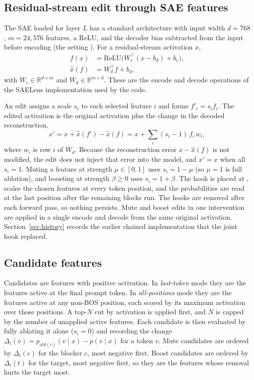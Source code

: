 \documentclass[conference]{IEEEtran}
\newcommand{\code}[1]{\texttt{\detokenize{#1}}}
\begin{document}
\subsection{Residual-stream edit through SAE features}
The SAE loaded for layer $L$ has a standard architecture with input width $d=768$, $m=24{,}576$ features, a ReLU, and the decoder bias subtracted from the input before encoding (the setting \code{apply_b_dec_to_input=True}). For a residual-stream activation $x$,
\begin{align}
f(x) &= \mathrm{ReLU}\!\big(W_e^{\top}(x-b_d)+b_e\big),\\
\hat{x}(f) &= W_d^{\top} f + b_d,
\end{align}
with $W_e\in\mathbb{R}^{d\times m}$ and $W_d\in\mathbb{R}^{m\times d}$. These are the encode and decode operations of the SAELens implementation used by the code.

An edit assigns a scale $s_i$ to each selected feature $i$ and forms $f'_i=s_i f_i$. The edited activation is the original activation plus the change in the decoded reconstruction,
\begin{equation}
x' = x + \hat{x}(f') - \hat{x}(f) = x + \sum_i (s_i-1)\, f_i\, w_i,
\end{equation}
where $w_i$ is row $i$ of $W_d$. Because the reconstruction error $x-\hat{x}(f)$ is not modified, the edit does not inject that error into the model, and $x'=x$ when all $s_i=1$. Muting a feature at strength $\mu\in[0,1]$ uses $s_i=1-\mu$ (so $\mu=1$ is full ablation), and boosting at strength $\beta\ge 0$ uses $s_i=1+\beta$. The hook is placed at \code{blocks.L.hook_resid_pre}, scales the chosen features at every token position, and the probabilities are read at the last position after the remaining blocks run. The hooks are removed after each forward pass, so nothing persists. Mute and boost edits in one intervention are applied in a single encode and decode from the same original activation. Section~\ref{sec:history} records the earlier chained implementation that the joint hook replaced.

\subsection{Candidate features}
\label{sec:candidates}
Candidates are features with positive activation. In \emph{last-token} mode they are the features active at the final prompt token. In \emph{all-positions} mode they are the features active at any non-BOS position, each scored by its maximum activation over those positions. A top-$N$ cut by activation is applied first, and $N$ is capped by the number of unapplied active features. Each candidate is then evaluated by fully ablating it alone ($s_i=0$) and recording the change $\Delta_i(v)=p_{\mathrm{abl}(i)}(v\mid x)-p(v\mid x)$ for a token $v$. Mute candidates are ordered by $\Delta_i(c)$ for the blocker $c$, most negative first. Boost candidates are ordered by $\Delta_i(t)$ for the target, most negative first, so they are the features whose removal hurts the target most.
\end{document}
